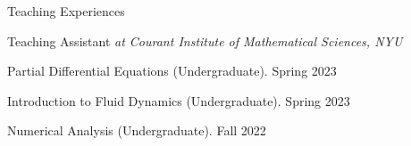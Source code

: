 \documentclass{resume} %
\begin{document}

\begin{rSection}{Teaching Experiences}
\begin{rSubsection}{Teaching Assistant {\normalfont\textit{at Courant Institute of Mathematical Sciences, NYU}}}{}{}{}
\item Partial Differential Equations (Undergraduate). \hfill Spring 2023
\item Introduction to Fluid Dynamics (Undergraduate). \hfill Spring 2023
\item Numerical Analysis (Undergraduate). \hfill Fall 2022
\end{rSubsection}
\end{rSection}

\end{document}
